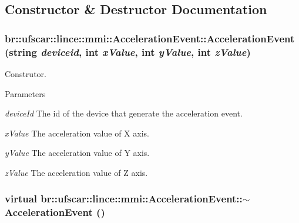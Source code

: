 \subsection{Constructor \& Destructor Documentation}
\hypertarget{classbr_1_1ufscar_1_1lince_1_1mmi_1_1AccelerationEvent_a0b697e055fc5bb1c3947435f0c25bd5d}{
\subsubsection[{AccelerationEvent}]{\setlength{\rightskip}{0pt plus 5cm}br::ufscar::lince::mmi::AccelerationEvent::AccelerationEvent (string {\em deviceid}, \/  int {\em xValue}, \/  int {\em yValue}, \/  int {\em zValue})}}
\label{classbr_1_1ufscar_1_1lince_1_1mmi_1_1AccelerationEvent_a0b697e055fc5bb1c3947435f0c25bd5d}


Construtor. 


\begin{DoxyParams}{Parameters}
\item[{\em deviceId}]The id of the device that generate the acceleration event. \item[{\em xValue}]The acceleration value of X axis. \item[{\em yValue}]The acceleration value of Y axis. \item[{\em zValue}]The acceleration value of Z axis. \end{DoxyParams}
\hypertarget{classbr_1_1ufscar_1_1lince_1_1mmi_1_1AccelerationEvent_ab80cc047d3044e1450fb74bb1e62f8ab}{
\subsubsection[{$\sim$AccelerationEvent}]{\setlength{\rightskip}{0pt plus 5cm}virtual br::ufscar::lince::mmi::AccelerationEvent::$\sim$AccelerationEvent ()}}
\label{classbr_1_1ufscar_1_1lince_1_1mmi_1_1AccelerationEvent_ab80cc047d3044e1450fb74bb1e62f8ab}



